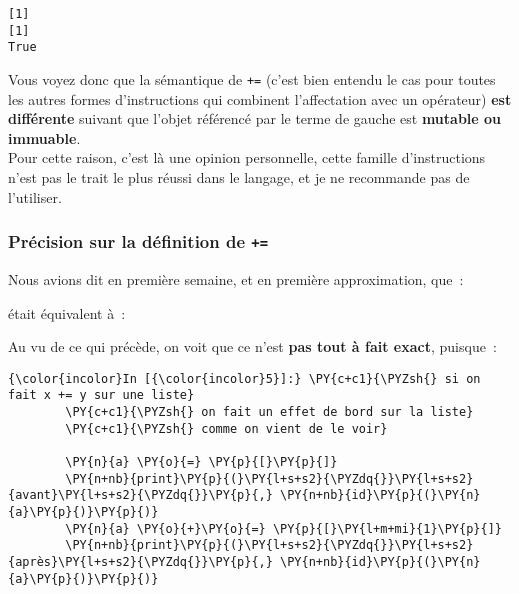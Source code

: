     \begin{Verbatim}[commandchars=\\\{\}]
[1]
[1]
True

    \end{Verbatim}

    Vous voyez donc que la sémantique de \texttt{+=} (c'est bien entendu le
cas pour toutes les autres formes d'instructions qui combinent
l'affectation avec un opérateur) \textbf{est différente} suivant que
l'objet référencé par le terme de gauche est \textbf{mutable ou
immuable}.\\

    Pour cette raison, c'est là une opinion personnelle, cette famille
d'instructions n'est pas le trait le plus réussi dans le langage, et je
ne recommande pas de l'utiliser.

    \hypertarget{pruxe9cision-sur-la-duxe9finition-de}{%
\subsubsection{\texorpdfstring{Précision sur la définition de
\texttt{+=}}{Précision sur la définition de +=}}\label{pruxe9cision-sur-la-duxe9finition-de}}

    Nous avions dit en première semaine, et en première approximation, que~:

\begin{Shaded}
\begin{Highlighting}[]
\OperatorTok{+=}
\end{Highlighting}
\end{Shaded}

était équivalent à~:

\begin{Shaded}
\begin{Highlighting}[]
\OperatorTok{=}\OperatorTok{+}
\end{Highlighting}
\end{Shaded}

    Au vu de ce qui précède, on voit que ce n'est \textbf{pas tout à fait
exact}, puisque~:

    \begin{Verbatim}[commandchars=\\\{\}]
{\color{incolor}In [{\color{incolor}5}]:} \PY{c+c1}{\PYZsh{} si on fait x += y sur une liste}
        \PY{c+c1}{\PYZsh{} on fait un effet de bord sur la liste}
        \PY{c+c1}{\PYZsh{} comme on vient de le voir}
        
        \PY{n}{a} \PY{o}{=} \PY{p}{[}\PY{p}{]}
        \PY{n+nb}{print}\PY{p}{(}\PY{l+s+s2}{\PYZdq{}}\PY{l+s+s2}{avant}\PY{l+s+s2}{\PYZdq{}}\PY{p}{,} \PY{n+nb}{id}\PY{p}{(}\PY{n}{a}\PY{p}{)}\PY{p}{)}
        \PY{n}{a} \PY{o}{+}\PY{o}{=} \PY{p}{[}\PY{l+m+mi}{1}\PY{p}{]}
        \PY{n+nb}{print}\PY{p}{(}\PY{l+s+s2}{\PYZdq{}}\PY{l+s+s2}{après}\PY{l+s+s2}{\PYZdq{}}\PY{p}{,} \PY{n+nb}{id}\PY{p}{(}\PY{n}{a}\PY{p}{)}\PY{p}{)}
\end{Verbatim}


